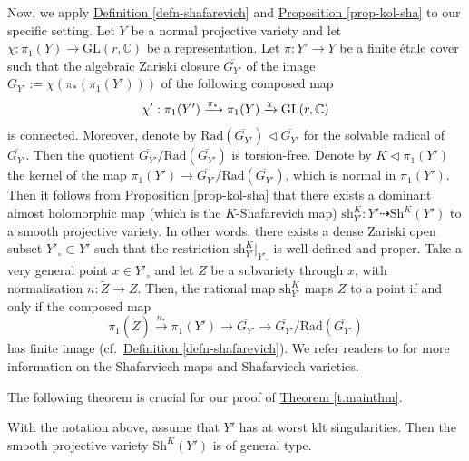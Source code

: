 Now, we apply {\hyperref[defn-shafarevich]{Definition   \ref*{defn-shafarevich}}}  and {\hyperref[prop-kol-sha]{Proposition  \ref*{prop-kol-sha}}} to our specific setting. 
Let $Y$ be a normal projective variety and let $\chi:\pi_1(Y)\rightarrow \text{GL}(r,\mathbb{C})$ be a representation. 
Let $\pi:Y'\rightarrow Y$ be a finite \'etale cover such that the algebraic Zariski closure $\overline{G_{Y'}}$ of the image $G_{Y'}:=\chi(\pi_*(\pi_1(Y')))$ of the following composed map
\[
\chi':\pi_1(Y') \xrightarrow{\pi_*} \pi_1(Y) \xrightarrow{\chi} \text{GL}(r,\mathbb C)
\]
is connected. 
Moreover, denote by $\text{Rad}(\overline{G_{Y'}})\lhd \overline{G_{Y'}}$ for the solvable radical of $\overline{G_{Y'}}$. 
Then the quotient $\overline{G_{Y'}}/\text{Rad}(\overline{G_{Y'}})$ is torsion-free. 
Denote by $K\lhd \pi_1(Y')$ the kernel of the map $\pi_1(Y')\rightarrow \overline{G_{Y'}}/\text{Rad}(\overline{G_{Y'}})$, which is normal in $\pi_1(Y')$.  
Then it follows from {\hyperref[prop-kol-sha]{Proposition  \ref*{prop-kol-sha}}} that there exists a dominant almost holomorphic map (which is the $K$-Shafarevich map) $\text{sh}_{Y'}^K:Y'\dashrightarrow \text{Sh}^K(Y')$ to a smooth projective variety. 
In other words, there exists a dense Zariski open subset $Y'_{\circ}\subset Y'$ such that the restriction $\text{sh}^K_{Y'}|_{Y'_{\circ}}$ is well-defined and proper. %
Take  a very general point $x\in Y'_{\circ}$ and let $Z$ be a subvariety through $x$, with normalisation $n:\widetilde{Z}\rightarrow Z$.   
Then, the rational map $\text{sh}^K_{Y'}$ maps $Z$ to a point if and only if the composed map
\[
\pi_1(\widetilde{Z})\xrightarrow{n_*} \pi_1(Y') \rightarrow \overline{G_{Y'}}\rightarrow \overline{G_{Y'}}/\text{Rad}(\overline{G_{Y'}})
\]
has finite image (cf.~{\hyperref[defn-shafarevich]{Definition   \ref*{defn-shafarevich}}}).  
We refer readers to \cite{CCE15} for more information on the Shafarviech maps and Shafarviech varieties. 

The following theorem is crucial for our proof of {\hyperref[t.mainthm]{Theorem \ref*{t.mainthm}}}.

\begin{thm}
	\label{t.basemfdShafarevichmap}
With the notation above, assume that $Y'$ has at worst klt singularities. Then the smooth projective variety $\text{Sh}^K(Y')$ is of general type.
\end{thm}

